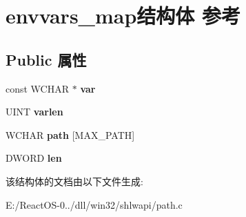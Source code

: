 \hypertarget{structenvvars__map}{}\section{envvars\+\_\+map结构体 参考}
\label{structenvvars__map}
\subsection*{Public 属性}
\begin{DoxyCompactItemize}
\item 
\mbox{\label{structenvvars__map_ab814ed2f5231548e627b0aab3ca8c8b4}} 
const W\+C\+H\+AR $\ast$ {\bfseries var}
\item 
\mbox{\label{structenvvars__map_adc279d78b7c5d970caa1a0f9a8d8c04d}} 
U\+I\+NT {\bfseries varlen}
\item 
\mbox{\label{structenvvars__map_a61a114f9c0df37d554d8291bab4aae8c}} 
W\+C\+H\+AR {\bfseries path} \mbox{[}M\+A\+X\+\_\+\+P\+A\+TH\mbox{]}
\item 
\mbox{\label{structenvvars__map_a9cac3093b478cb955878ec73ba672228}} 
D\+W\+O\+RD {\bfseries len}
\end{DoxyCompactItemize}


该结构体的文档由以下文件生成\+:\begin{DoxyCompactItemize}
\item 
E\+:/\+React\+O\+S-\/0../dll/win32/shlwapi/path.\+c\end{DoxyCompactItemize}
